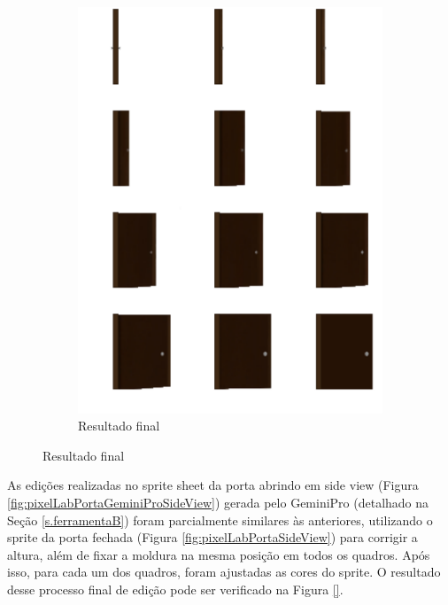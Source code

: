 \begin{figure}[htbp]
\begin{subfigure}{0.45\linewidth}
    \end{subfigure}
    \begin{subfigure}{0.45\linewidth}
        \centering
        \includegraphics[width=1\linewidth]{figs/pixelLab/final/side_door_pixel_vidu.png}
        \caption{\small Resultado final}
        \label{fig:pixelLabFinalPortaSideView2}
    \end{subfigure}

\end{figure}

As edições realizadas no sprite sheet da porta abrindo em side view (Figura \ref{fig:pixelLabPortaGeminiProSideView}) gerada pelo GeminiPro (detalhado na Seção \ref{s.ferramentaB}) foram parcialmente similares às anteriores, utilizando o sprite da porta fechada (Figura \ref{fig:pixelLabPortaSideView}) para corrigir a altura, além de fixar a moldura na mesma posição em todos os quadros. Após isso, para cada um dos quadros, foram ajustadas as cores do sprite. O resultado desse processo final de edição pode ser verificado na Figura \ref{}.

